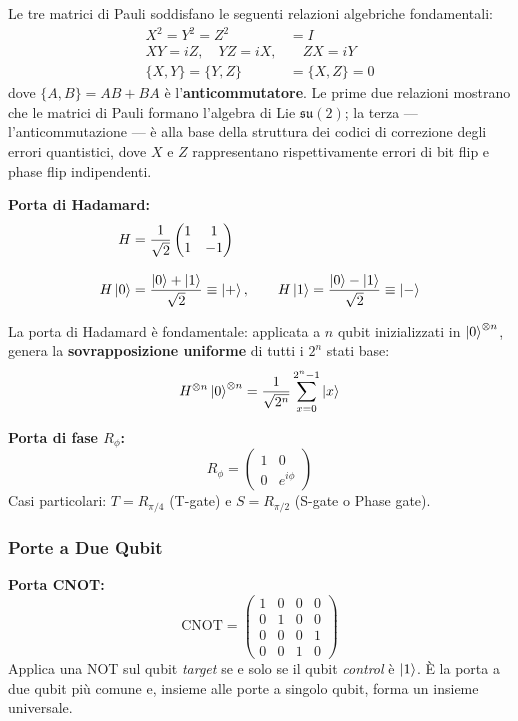 \begin{onehalfspace}
Le tre matrici di Pauli soddisfano le seguenti relazioni algebriche fondamentali:
\begin{align}
    X^2 = Y^2 = Z^2 &= I \\
    XY = iZ, \quad YZ = iX, &\quad ZX = iY \\
    \{X, Y\} = \{Y, Z\} &= \{X, Z\} = 0
\end{align}
dove $\{A, B\} = AB + BA$ è l'\textbf{anticommutatore}. Le prime due relazioni mostrano che le matrici di Pauli formano l'algebra di Lie $\mathfrak{su}(2)$; la terza --- l'anticommutazione --- è alla base della struttura dei codici di correzione degli errori quantistici, dove $X$ e $Z$ rappresentano rispettivamente errori di bit flip e phase flip indipendenti.

\textbf{Porta di Hadamard:}
\begin{align}
    H &= \frac{1}{\sqrt{2}}\begin{pmatrix} 1 & 1 \\ 1 & -1 \end{pmatrix} \notag \\[8pt]
    H\ket{0} &= \frac{\ket{0}+\ket{1}}{\sqrt{2}} \equiv \ket{+}, \qquad
    H\ket{1} = \frac{\ket{0}-\ket{1}}{\sqrt{2}} \equiv \ket{-}
\end{align}

La porta di Hadamard è fondamentale: applicata a $n$ qubit inizializzati in $\ket{0}^{\otimes n}$, genera la \textbf{sovrapposizione uniforme} di tutti i $2^n$ stati base:
\begin{equation}
    H^{\otimes n}\ket{0}^{\otimes n} = \frac{1}{\sqrt{2^n}}\sum_{x=0}^{2^n-1}\ket{x}
\end{equation}

\textbf{Porta di fase $R_\phi$:}
\begin{equation}
    R_\phi = \begin{pmatrix} 1 & 0 \\ 0 & e^{i\phi} \end{pmatrix}
\end{equation}
Casi particolari: $T = R_{\pi/4}$ (T-gate) e $S = R_{\pi/2}$ (S-gate o Phase gate).

\subsubsection{Porte a Due Qubit}

\textbf{Porta \ac{CNOT}:}
\begin{equation}
    \text{CNOT} = \begin{pmatrix} 1&0&0&0 \\ 0&1&0&0 \\ 0&0&0&1 \\ 0&0&1&0 \end{pmatrix}
\end{equation}
Applica una NOT sul qubit \textit{target} se e solo se il qubit \textit{control} è $\ket{1}$. È la porta a due qubit più comune e, insieme alle porte a singolo qubit, forma un insieme universale.


\end{onehalfspace}
